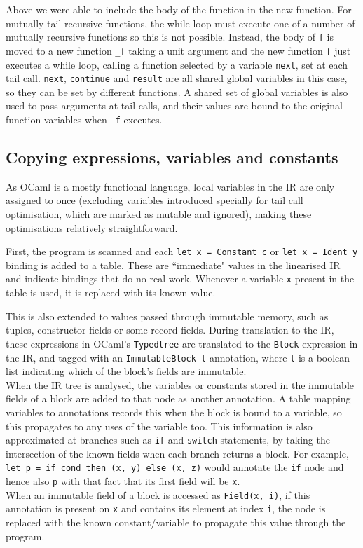 Above we were able to include the body of the function in the new function. For mutually tail recursive functions, the while loop must execute one of a number of mutually recursive functions so this is not possible. Instead, the body of \verb|f| is moved to a new function \verb|_f| taking a unit argument and the new function \verb|f| just executes a while loop, calling a function selected by a variable \verb|next|, set at each tail call. \verb|next|, \verb|continue| and \verb|result| are all shared global variables in this case, so they can be set by different functions. A shared set of global variables is also used to pass arguments at tail calls, and their values are bound to the original function variables when \verb|_f| executes.



\subsection{Copying expressions, variables and constants}
As OCaml is a mostly functional language, local variables in the IR are only assigned to once (excluding variables introduced specially for tail call optimisation, which are marked as mutable and ignored), making these optimisations relatively straightforward. 

First, the program is scanned and each \verb|let x = Constant c| or \verb|let x = Ident y| binding is added to a table. %
These are ``immediate" values in the linearised IR and indicate bindings that do no real work. Whenever a variable \verb|x| present in the table is used, it is replaced with its known value. 

This is also extended to values passed through immutable memory, such as tuples, constructor fields or some record fields. During translation to the IR, these expressions in OCaml's \verb|Typedtree| are translated to the \verb|Block| expression in the IR, and tagged with an \verb|ImmutableBlock l| annotation, where \verb|l| is a boolean list indicating which of the block's fields are immutable. \\
When the IR tree is analysed, the variables or constants stored in the immutable fields of a block are added to that node as another annotation. A table mapping variables to annotations records this when the block is bound to a variable, so this propagates to any uses of the variable too. This information is also approximated at branches such as \verb|if| and \verb|switch| statements, by taking the intersection of the known fields when each branch returns a block. For example, \verb|let p = if cond then (x, y) else (x, z)| would annotate the \verb|if| node and hence also \verb|p| with that fact that its first field will be \verb|x|. \\
When an immutable field of a block is accessed as \verb|Field(x, i)|, if this annotation is present on \verb|x| and contains its element at index \verb|i|, the node is replaced with the known constant/variable to propagate this value through the program.

